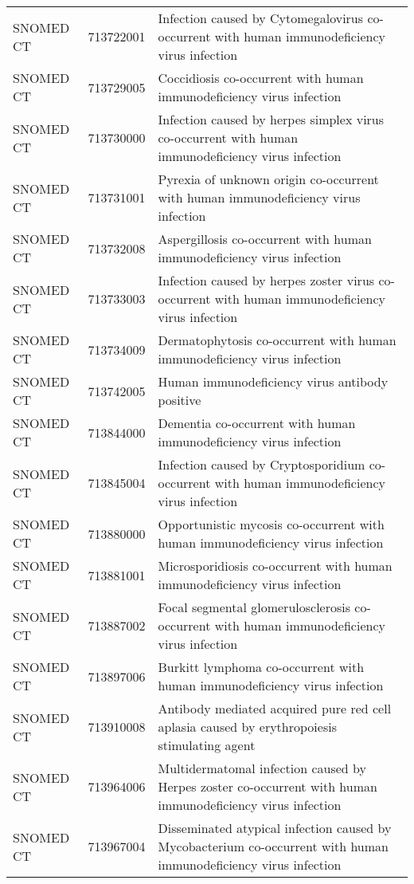 \begin{longtable}{p{}p{}p{}}
  SNOMED CT & 713722001 & Infection caused by Cytomegalovirus co-occurrent with human immunodeficiency virus infection \\ 
  SNOMED CT & 713729005 & Coccidiosis co-occurrent with human immunodeficiency virus infection \\ 
  SNOMED CT & 713730000 & Infection caused by herpes simplex virus co-occurrent with human immunodeficiency virus infection \\ 
  SNOMED CT & 713731001 & Pyrexia of unknown origin co-occurrent with human immunodeficiency virus infection \\ 
  SNOMED CT & 713732008 & Aspergillosis co-occurrent with human immunodeficiency virus infection \\ 
  SNOMED CT & 713733003 & Infection caused by herpes zoster virus co-occurrent with human immunodeficiency virus infection \\ 
  SNOMED CT & 713734009 & Dermatophytosis co-occurrent with human immunodeficiency virus infection \\ 
  SNOMED CT & 713742005 & Human immunodeficiency virus antibody positive \\ 
  SNOMED CT & 713844000 & Dementia co-occurrent with human immunodeficiency virus infection \\ 
  SNOMED CT & 713845004 & Infection caused by Cryptosporidium co-occurrent with human immunodeficiency virus infection \\ 
  SNOMED CT & 713880000 & Opportunistic mycosis co-occurrent with human immunodeficiency virus infection \\ 
  SNOMED CT & 713881001 & Microsporidiosis co-occurrent with human immunodeficiency virus infection \\ 
  SNOMED CT & 713887002 & Focal segmental glomerulosclerosis co-occurrent with human immunodeficiency virus infection \\ 
  SNOMED CT & 713897006 & Burkitt lymphoma co-occurrent with human immunodeficiency virus infection \\ 
  SNOMED CT & 713910008 & Antibody mediated acquired pure red cell aplasia caused by erythropoiesis stimulating agent \\ 
  SNOMED CT & 713964006 & Multidermatomal infection caused by Herpes zoster co-occurrent with human immunodeficiency virus infection \\ 
  SNOMED CT & 713967004 & Disseminated atypical infection caused by Mycobacterium co-occurrent with human immunodeficiency virus infection \\ 

\end{longtable}
